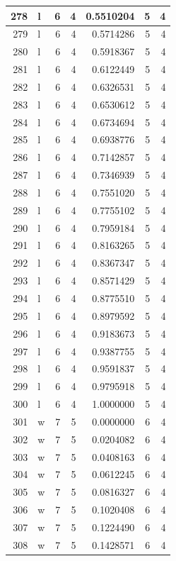 \documentclass[
  letterpaper,
  DIV=11,
  numbers=noendperiod]{scrreprt}
\begin{document}
\begin{table}
\begin{tabular}[t]{r|l|r|r|r|r|r}
\hline
278 & l & 6 & 4 & 0.5510204 & 5 & 4\\
\hline
279 & l & 6 & 4 & 0.5714286 & 5 & 4\\
\hline
280 & l & 6 & 4 & 0.5918367 & 5 & 4\\
\hline
281 & l & 6 & 4 & 0.6122449 & 5 & 4\\
\hline
282 & l & 6 & 4 & 0.6326531 & 5 & 4\\
\hline
283 & l & 6 & 4 & 0.6530612 & 5 & 4\\
\hline
284 & l & 6 & 4 & 0.6734694 & 5 & 4\\
\hline
285 & l & 6 & 4 & 0.6938776 & 5 & 4\\
\hline
286 & l & 6 & 4 & 0.7142857 & 5 & 4\\
\hline
287 & l & 6 & 4 & 0.7346939 & 5 & 4\\
\hline
288 & l & 6 & 4 & 0.7551020 & 5 & 4\\
\hline
289 & l & 6 & 4 & 0.7755102 & 5 & 4\\
\hline
290 & l & 6 & 4 & 0.7959184 & 5 & 4\\
\hline
291 & l & 6 & 4 & 0.8163265 & 5 & 4\\
\hline
292 & l & 6 & 4 & 0.8367347 & 5 & 4\\
\hline
293 & l & 6 & 4 & 0.8571429 & 5 & 4\\
\hline
294 & l & 6 & 4 & 0.8775510 & 5 & 4\\
\hline
295 & l & 6 & 4 & 0.8979592 & 5 & 4\\
\hline
296 & l & 6 & 4 & 0.9183673 & 5 & 4\\
\hline
297 & l & 6 & 4 & 0.9387755 & 5 & 4\\
\hline
298 & l & 6 & 4 & 0.9591837 & 5 & 4\\
\hline
299 & l & 6 & 4 & 0.9795918 & 5 & 4\\
\hline
300 & l & 6 & 4 & 1.0000000 & 5 & 4\\
\hline
301 & w & 7 & 5 & 0.0000000 & 6 & 4\\
\hline
302 & w & 7 & 5 & 0.0204082 & 6 & 4\\
\hline
303 & w & 7 & 5 & 0.0408163 & 6 & 4\\
\hline
304 & w & 7 & 5 & 0.0612245 & 6 & 4\\
\hline
305 & w & 7 & 5 & 0.0816327 & 6 & 4\\
\hline
306 & w & 7 & 5 & 0.1020408 & 6 & 4\\
\hline
307 & w & 7 & 5 & 0.1224490 & 6 & 4\\
\hline
308 & w & 7 & 5 & 0.1428571 & 6 & 4\\

\end{tabular}
\end{table}
\end{document}
